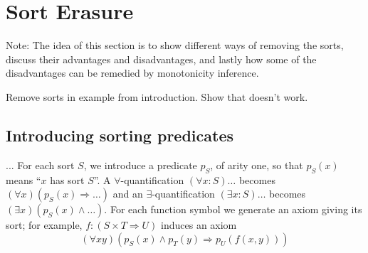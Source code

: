 
\section{Sort Erasure}

Note: The idea of this section is to show different ways of removing the
sorts, discuss their advantages and disadvantages, and lastly
how some of the disadvantages can be remedied by monotonicity inference.


Remove sorts in example from introduction. Show that doesn't work.









\subsection{Introducing sorting predicates}

... For each sort $S$, we introduce a predicate $p_S$, of arity one,
so that $p_S(x)$ means ``$x$ has sort $S$''. A
$\forall$-quantification $(\forall x:S)\ldots$ becomes $(\forall
x)(p_S(x) \Rightarrow \ldots)$ and an $\exists$-quantification
$(\exists x:S)\ldots$ becomes $(\exists x)(p_S(x) \land \ldots)$. For
each function symbol we generate an axiom giving its sort; for
example, $f : (S \times T \Rightarrow U)$ induces an axiom
\begin{displaymath}
(\forall x y)(p_S(x) \land p_T(y) \Rightarrow p_U(f(x, y)))
\end{displaymath}

